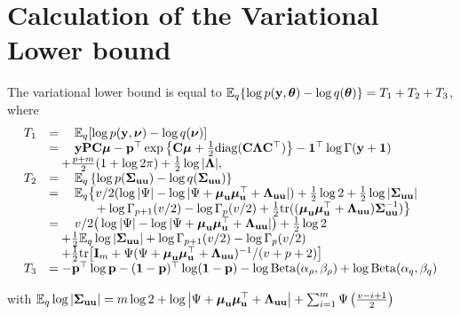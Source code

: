 \section{Calculation of the Variational Lower bound} 
		
The variational lower bound is equal to ${\mathbb E}_q\{\log{p({\bf y}, {\boldsymbol\theta})} - \log{q({\boldsymbol\theta})}\} = T_1 + T_2 + T_3$,
where
\begin{equation*}
\begin{array}{rl}
	T_1 & = \quad \bE_q[\log{p(\vy, \vnu)} - \log{q(\vnu)}]\\
	    & = \quad \vy \mP \mC \vmu - \vp^\top \exp{\left\{ \mC \vmu + \frac{1}{2} \text{diag} (\mC \mLambda \mC^\top) \right\}} - \vone^\top\log \Gamma{(\vy + \vone)}\\
	    & \quad + \frac{p + m}{2} (1 + \log{2 \pi}) + \frac{1}{2} \log{|\mLambda|},\\
	T_2 & = \quad \bE_q \left\{ \log p(\mSigma_{\vu \vu}) - \log q(\mSigma_{\vu \vu}) \right\}\\
	    & = \quad \bE_q \big\{ v/2(\log |\Psi| - \log |\Psi + \vmu_\vu \vmu_\vu^\top + \mLambda_{\vu \vu}|) + \frac{1}{2} \log 2 + \frac{1}{2} \log|\mSigma_{\vu \vu}| \\
	    & \qquad \hphantom{\bE_q \{} + \log \Gamma_{p+1}(v/2) - \log \Gamma_{p}(v/2)    
	    + \frac{1}{2} \tr((\vmu_{\vu} \vmu_{\vu}^\top + \mLambda_{\vu \vu}) \mSigma_{\vu \vu}^{-1}) \big\} \\
	    & = \quad v/2\big(\log |\Psi| - \log |\Psi + \vmu_\vu \vmu_\vu^\top + \mLambda_{\vu \vu}|\big) + \frac{1}{2} \log 2 \\
	    & \quad + \frac{1}{2} \bE_q \log |\mSigma_{\vu \vu}| + \log \Gamma_{p+1}(v/2) - \log \Gamma_{p}(v/2) \\
	    & \quad + \frac{1}{2} \tr\big[\mI_m + \Psi(\Psi+ \vmu_\vu \vmu_\vu^\top + \mLambda_{\vu \vu})^{-1}/(v + p + 2)\big] \\
	T_3 & = - \vp^\top \log \vp - (\vone - \vp)^\top \log (\vone - \vp) - \log \Beta (\alpha_\rho, \beta_\rho) + \log \Beta (\alpha_q, \beta_q)                                                              
\end{array}
\end{equation*}
		
\noindent with ${\mathbb E}_q \log |{\boldsymbol \Sigma}_{{\bf u} {\bf u}}| = m \log 2 + \log \left | \Psi + {\boldsymbol \mu}_{\bf u} {\boldsymbol \mu}_{\bf u}^\top + {\boldsymbol \Lambda}_{{\bf u} {\bf u}} \right | + \sum_{i=1}^m \Psi \left ( \frac{v - i + 1}{2} \right )$

